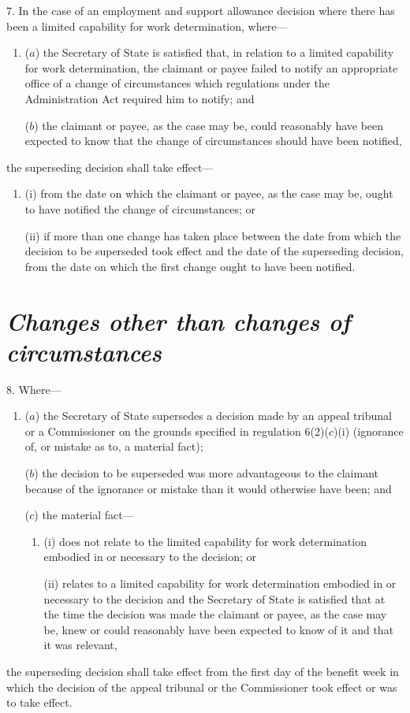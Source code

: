 \documentclass[12pt,a4paper]{article}
\begin{document}
7.  In the case of an employment and support allowance decision where there has been a limited capability for work determination, where—
\begin{enumerate}\item[]
($a$) the Secretary of State is satisfied that, in relation to a limited capability for work determination, the claimant or payee failed to notify an appropriate office of a change of circumstances which regulations under the Administration Act required him to notify; and

($b$) the claimant or payee, as the case may be, could reasonably have been expected to know that the change of circumstances should have been notified,
\end{enumerate}
the superseding decision shall take effect—
\begin{enumerate}\item[]
(i) from the date on which the claimant or payee, as the case may be, ought to have notified the change of circumstances; or

(ii) if more than one change has taken place between the date from which the decision to be superseded took effect and the date of the superseding decision, from the date on which the first change ought to have been notified.
\end{enumerate}

\section*{\itshape Changes other than changes of circumstances}

8.  Where—
\begin{enumerate}\item[]
($a$) the Secretary of State supersedes a decision made by an appeal tribunal or a Commissioner on the grounds specified in regulation 6(2)($c$)(i)  (ignorance of, or mistake as to, a material fact);

($b$) the decision to be superseded was more advantageous to the claimant because of the ignorance or mistake than it would otherwise have been; and

($c$) the material fact—
\begin{enumerate}\item[]
(i) does not relate to the limited capability for work determination embodied in or necessary to the decision; or

(ii) relates to a limited capability for work determination embodied in or necessary to the decision and the Secretary of State is satisfied that at the time the decision was made the claimant or payee, as the case may be, knew or could reasonably have been expected to know of it and that it was relevant,
\end{enumerate}
\end{enumerate}
the superseding decision shall take effect from the first day of the benefit week in which the decision of the appeal tribunal or the Commissioner took effect or was to take effect.
\end{document}
